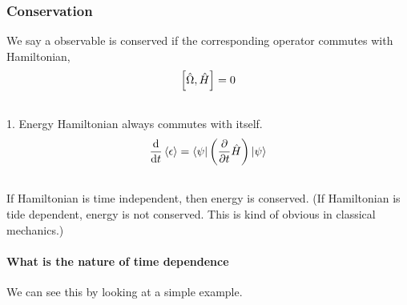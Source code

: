 \documentclass[letterpaper,10pt,english]{sphinxmanual}
\def\d{{\rm d}}
\begin{document}
\subsubsection{Conservation}
\label{QuantumMechanics:conservation}
We say a observable is conserved if the corresponding operator commutes with Hamiltonian,
\begin{gather}
\begin{split}\left[ \hat \Omega, \hat H \right]=0\end{split}\notag\\\begin{split}\end{split}\notag
\end{gather}
1. Energy
Hamiltonian always commutes with itself.
\begin{gather}
\begin{split}\frac{\d}{\d t} \left<\epsilon \right> = \bra{\psi} \left( \frac{\partial }{\partial t} \hat H \right) \ket{\psi}\end{split}\notag\\\begin{split}\end{split}\notag
\end{gather}
If Hamiltonian is time independent, then energy is conserved. (If Hamiltonian is tide dependent, energy is not conserved. This is kind of obvious in classical mechanics.)


\paragraph{What is the nature of time dependence}
\label{QuantumMechanics:what-is-the-nature-of-time-dependence}
We can see this by looking at a simple example.
\end{document}

